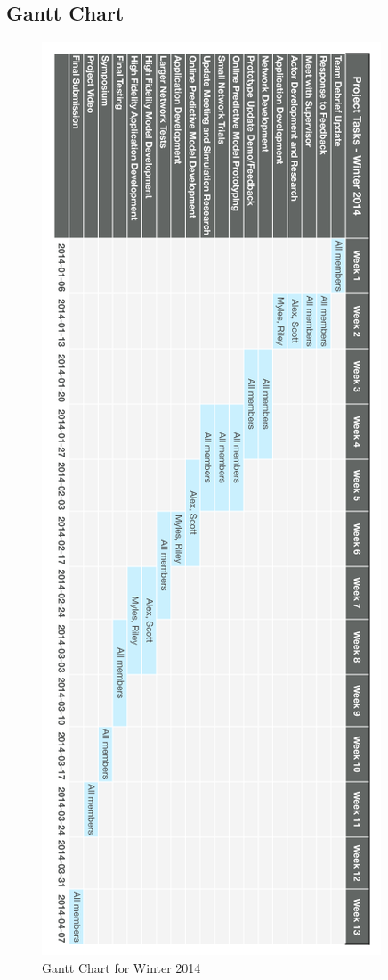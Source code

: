 \documentclass{article}
\begin{document}
\subsection{Gantt Chart}
\begin{figure}[htbp!]
  \begin{centering}
    \includegraphics[scale=0.5]{figures/gantt-vertical.png}
    \caption{Gantt Chart for Winter 2014}
    \label{fig:gantt}
  \end{centering}
\end{figure}
\end{document}
